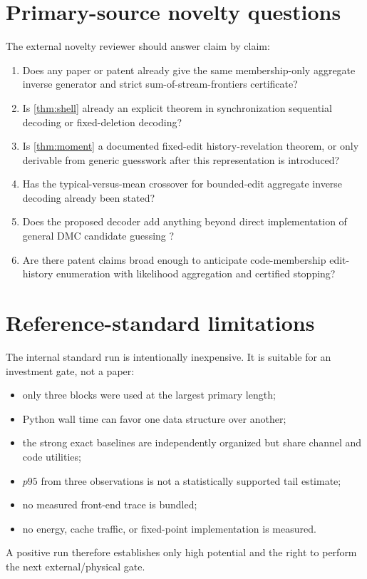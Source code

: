 \documentclass[11pt]{article}
\theoremstyle{definition}
\theoremstyle{remark}
\begin{document}
\section{Primary-source novelty questions}
The external novelty reviewer should answer claim by claim:
\begin{enumerate}[leftmargin=2em]
\item Does any paper or patent already give the same membership-only aggregate inverse generator and strict sum-of-stream-frontiers certificate?
\item Is \cref{thm:shell} already an explicit theorem in synchronization sequential decoding or fixed-deletion decoding?
\item Is \cref{thm:moment} a documented fixed-edit history-revelation theorem, or only derivable from generic guesswork after this representation is introduced?
\item Has the typical-versus-mean crossover for bounded-edit aggregate inverse decoding already been stated?
\item Does the proposed decoder add anything beyond direct implementation of general DMC candidate guessing \cite{TanJoudeh2025}?
\item Are there patent claims broad enough to anticipate code-membership edit-history enumeration with likelihood aggregation and certified stopping?
\end{enumerate}

\section{Reference-standard limitations}
The internal standard run is intentionally inexpensive.  It is suitable for an investment gate, not a paper:
\begin{itemize}[leftmargin=2em]
\item only three blocks were used at the largest primary length;
\item Python wall time can favor one data structure over another;
\item the strong exact baselines are independently organized but share channel and code utilities;
\item $p95$ from three observations is not a statistically supported tail estimate;
\item no measured front-end trace is bundled;
\item no energy, cache traffic, or fixed-point implementation is measured.
\end{itemize}
A positive run therefore establishes only high potential and the right to perform the next external/physical gate.
\end{document}
